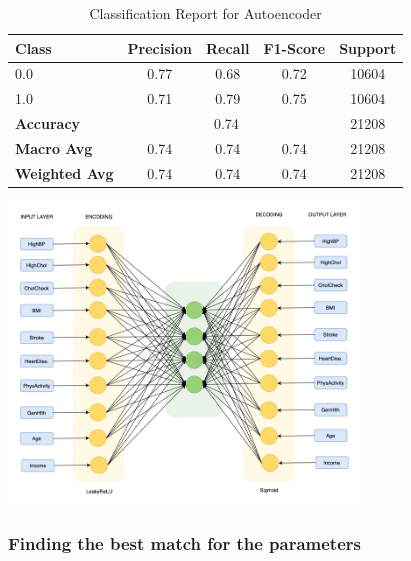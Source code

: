 \begin{table}[h!]
    \centering
    \begin{tabular}{lcccc}
        \hline
        \textbf{Class} & \textbf{Precision} & \textbf{Recall} & \textbf{F1-Score} & \textbf{Support} \\
        \hline
        0.0 & 0.77 & 0.68 & 0.72 & 10604 \\
        1.0 & 0.71 & 0.79 & 0.75 & 10604 \\
        \hline
        \textbf{Accuracy} & \multicolumn{3}{c}{0.74} & 21208 \\
        \textbf{Macro Avg} & 0.74 & 0.74 & 0.74 & 21208 \\
        \textbf{Weighted Avg} & 0.74 & 0.74 & 0.74 & 21208 \\
        \hline
    \end{tabular}
    \caption{Classification Report for Autoencoder}
    \label{tab:autoencoder_classification_report}
\end{table}

\vspace{0.5cm}
\begin{center}
    \includegraphics[width=0.7\textwidth]{images/autoencoder.png}
\end{center}
\vspace{0.5cm}

\subsubsection{Finding the best match for the parameters}


